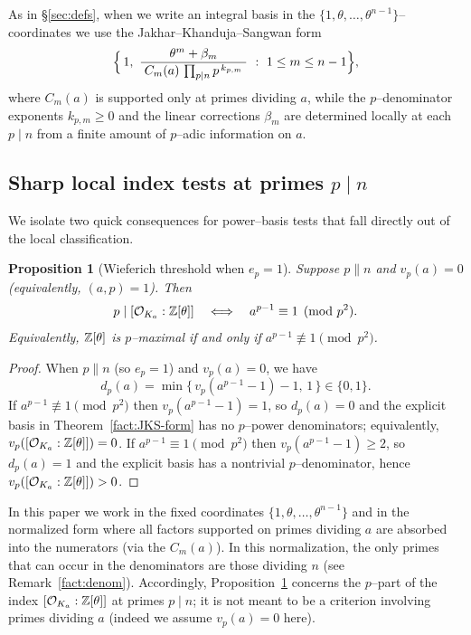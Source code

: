 \documentclass[12pt,a4paper,oneside]{amsart}
\newtheorem{proposition}[theorem]{Proposition}
\theoremstyle{definition}
\begin{document}
As in \S\ref{sec:defs}, when we write an integral basis in the $\{1,\theta,\dots,\theta^{n-1}\}$–coordinates
we use the Jakhar--Khanduja--Sangwan form
\[
\Bigl\{\,1,\ \frac{\theta^m+\beta_m}{\;C_m(a)\,\prod_{p\mid n}p^{\,k_{p,m}}\;}\ :\ 1\le m\le n-1\Bigr\},
\]
where $C_m(a)$ is supported only at primes dividing $a$, while the $p$–denominator exponents $k_{p,m}\ge0$ and the linear corrections $\beta_m$ are determined locally at each $p\mid n$ from a finite amount of $p$–adic information on $a$.

\subsection{Sharp local index tests at primes \(p\mid n\)}\label{subsec:monogeneity}


We isolate two quick consequences for power–basis tests that fall directly out of the local
classification.

\begin{proposition}[Wieferich threshold when \(e_p=1\)]\label{prop:wieferich}
Suppose $p\parallel n$ and $v_p(a)=0$ (equivalently, $(a,p)=1$). Then
\[
p\mid[\mathcal O_{K_a}:\Bbb Z[\theta]]
\quad\Longleftrightarrow\quad
a^{p-1}\equiv 1 \pmod{p^2}.
\]
Equivalently, $\Bbb Z[\theta]$ is $p$--maximal if and only if $a^{p-1}\not\equiv 1\pmod{p^2}$.
\end{proposition}

\begin{proof}
When $p\parallel n$ (so $e_p=1$) and $v_p(a)=0$, we have
\[
d_p(a)=\min\{\,v_p(a^{p-1}-1)-1,\,1\,\}\in\{0,1\}.
\]
If $a^{p-1}\not\equiv 1\pmod{p^2}$ then $v_p(a^{p-1}-1)=1$, so $d_p(a)=0$ and the explicit basis in
Theorem~\ref{fact:JKS-form} has no $p$--power denominators; equivalently,
$v_p([\mathcal O_{K_a}:\Bbb Z[\theta]])=0$.
If $a^{p-1}\equiv 1\pmod{p^2}$ then $v_p(a^{p-1}-1)\ge 2$, so $d_p(a)=1$ and the explicit basis has a
nontrivial $p$--denominator, hence $v_p([\mathcal O_{K_a}:\Bbb Z[\theta]])>0$.
\end{proof}


In this paper we work in the fixed coordinates $\{1,\theta,\dots,\theta^{n-1}\}$ and in the normalized form where all factors supported on primes dividing $a$ are absorbed into the numerators (via the $C_m(a)$).  In this normalization, the only primes that can occur in the denominators are those dividing $n$ (see Remark~\ref{fact:denom}).  Accordingly, Proposition~\ref{prop:wieferich} concerns the $p$--part of the index $[\mathcal O_{K_a}:\Bbb Z[\theta]]$ at primes $p\mid n$; it is not meant to be a criterion involving primes dividing $a$ (indeed we assume $v_p(a)=0$ here).
\end{document}
